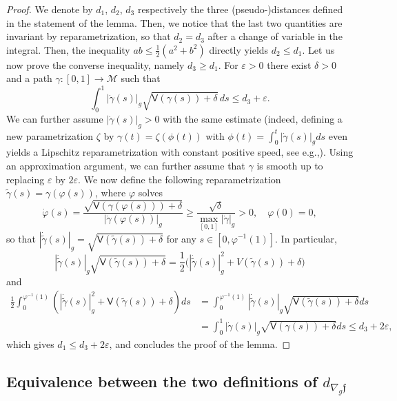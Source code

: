 \documentclass[11pt]{article}
\newcommand{\eg}{e.g.,\xspace}
\numberwithin{equation}{section}
\theoremstyle{definition}
\newcommand{\M}{\ensuremath{\mathcal M}}
\newcommand{\f}{\ensuremath{\mathfrak{f}}}
\newcommand\bnp{\begin{proof}}
\newcommand\enp{\end{proof}}
\newcommand\nablag{\nabla_{g}}
\let\e\varepsilon
\let\eps\varepsilon
\begin{document}
\bnp
We denote by $d_1$, $d_2$, $d_3$ respectively the three (pseudo-)distances defined in the statement of the lemma.
Then, we notice that the last two quantities are invariant by reparametrization, so that $d_2=d_3$ after a change of variable in the integral. Then, the inequality $ab\leq \frac{1}{2}(a^2+b^2)$ directly yields $d_2\leq d_1$. Let us now prove the converse inequality, namely $d_3 \geq d_1$. For $\e>0$ there exist $\delta>0$ and a path $\gamma:[0,1]\to \M$ such that\vspace*{-3pt}
\[
\int_0^1 |\dot{\gamma}(s)|_g\sqrt{\mathsf{V}(\gamma(s))+\delta} \, ds\leq d_{3}+\e.
\]
We can further assume $|\dot{\gamma}(s)|_g>0$ with the same estimate (indeed, defining a new parametrization $\zeta$ by $\gamma(t) = \zeta(\phi(t))$ with $\phi(t) = \int_0^t |\dot{\gamma}(s)|_g ds$ even yields a Lipschitz reparametrization with constant positive speed, see \eg \cite[Proof of Lem.\,3.16]{BarilariAgrachevBoscainBook:20}). Using an approximation argument, we can further assume that $\gamma$ is smooth up to replacing $\e$ by $2\eps$.
We now define the following reparametrization $\widetilde{\gamma}(s)=\gamma(\varphi(s))$, where $\varphi$ solves\vspace*{-3pt}
\[
\dot{\varphi}(s)=\frac{\sqrt{\mathsf{V}(\gamma(\varphi(s)))+\delta}}{|\dot{\gamma}(\varphi(s))|_g}\geq \frac{\sqrt{\delta}}{\max_{[0,1]} |\dot{\gamma}|_g}>0,\quad \varphi(0)=0,
\]
so that $|\dot{\widetilde{\gamma}}(s)|_g=\sqrt{\mathsf{V}(\widetilde{\gamma}(s))+\delta} $ for any $s\in [0,\varphi^{-1}(1)]$. In particular,
\[
|\dot{\widetilde{\gamma}}(s)|_g\sqrt{\mathsf{V}(\widetilde{\gamma}(s))+\delta}=\frac12\bigl(|\dot{\widetilde{\gamma}}(s)|_g^2+V(\widetilde{\gamma}(s))+\delta\bigr)
\]
and\vspace*{-3pt}
\begin{align*}
\frac12 \int_0^{\varphi^{-1}(1)}\left(|\dot{\widetilde{\gamma}}(s)|_g^2+\mathsf{V}(\widetilde{\gamma}(s))+\delta\right) ds
& = \int_0^{\varphi^{-1}(1)} |\dot{\widetilde{\gamma}}(s)|_g\sqrt{\mathsf{V}(\widetilde{\gamma}(s))+\delta} ds \\
&=\int_0^1 |\dot{\gamma}(s)|_g\sqrt{\mathsf{V}(\gamma(s))+\delta} ds\leq d_{3}+2\e,
\end{align*}
which gives $d_1\leq d_3+2\e$, and concludes the proof of the lemma.
\enp

\subsection{Equivalence between the two definitions of $d_{\nablag \f}$}
\end{document}
